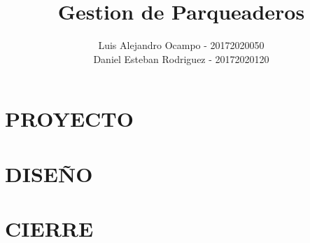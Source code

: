 \documentclass[11pt,twoside,letterpaper]{book}
\title{Gestion de Parqueaderos}
\author{Luis Alejandro Ocampo - 20172020050\\
Daniel Esteban Rodriguez - 20172020120}
\begin{document}
\maketitle
\tableofcontents
\listoffigures
\part{PROYECTO}



\part{DISEÑO}









\part{CIERRE}




\end{document}
